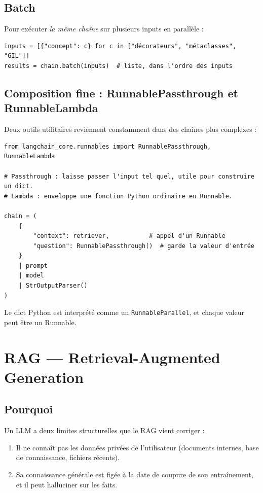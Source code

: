 \documentclass[11pt,a4paper]{article}
\begin{document}
\subsection{Batch}

Pour exécuter \emph{la même chaîne} sur plusieurs inputs en parallèle :

\begin{verbatim}
inputs = [{"concept": c} for c in ["décorateurs", "métaclasses", "GIL"]]
results = chain.batch(inputs)  # liste, dans l'ordre des inputs
\end{verbatim}

\subsection{Composition fine : RunnablePassthrough et RunnableLambda}

Deux outils utilitaires reviennent constamment dans des chaînes plus complexes :

\begin{verbatim}
from langchain_core.runnables import RunnablePassthrough, RunnableLambda

# Passthrough : laisse passer l'input tel quel, utile pour construire un dict.
# Lambda : enveloppe une fonction Python ordinaire en Runnable.

chain = (
    {
        "context": retriever,           # appel d'un Runnable
        "question": RunnablePassthrough()  # garde la valeur d'entrée
    }
    | prompt
    | model
    | StrOutputParser()
)
\end{verbatim}

Le dict Python est interprété comme un \texttt{RunnableParallel}, et chaque valeur peut être un Runnable.

\section{RAG --- Retrieval-Augmented Generation}

\subsection{Pourquoi}

Un LLM a deux limites structurelles que le RAG vient corriger :

\begin{enumerate}
  \item Il ne connaît pas les données privées de l'utilisateur (documents internes, base de connaissance, fichiers récents).
  \item Sa connaissance générale est figée à la date de coupure de son entraînement, et il peut halluciner sur les faits.
\end{enumerate}
\end{document}
